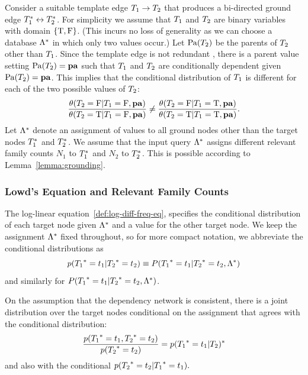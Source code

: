 \documentclass[runningheads,a4paper]{llncs}
\begin{document}
Consider a suitable template edge $T_{1} \rightarrow T_{2}$ that produces a bi-directed ground edge $T_{1}^{*}\hspace{0.0ex} \leftrightarrow T_{2}^{*}\hspace{0.0ex}$. For simplicity we assume that $T_{1}$ and $T_{2}$ are binary variables with domain $\{\mathrm{T},\mathrm{F}\}$. (This incurs no loss of generality as we can choose a database $\Lambda^{*}\hspace{0.0ex}$ in which only two values occur.) Let $\mathrm{Pa}(T_{2})$ be the parents of $T_{2}$ other than $T_{1}$. Since the template edge is not redundant \cite{Pearl1988}, there is a parent value setting $\mathrm{Pa}(T_{2}) = \mathbf{pa}$ such that $T_{1}$ and $T_{2}$ are conditionally dependent given $\mathrm{Pa}(T_{2}) = \mathbf{pa}$. This implies that the conditional distribution of $T_{1}$ is different for each of the two possible values of $T_{2}$:
\begin{equation} \label{eq:dependence}
\frac{\theta(T_{2} = \mathrm{F}|T_{1} = \mathrm{F},\mathbf{pa})}{\theta(T_{2} = \mathrm{T}|T_{1} = \mathrm{F},\mathbf{pa})} \neq \frac{\theta(T_{2} = \mathrm{F}|T_{1} = \mathrm{T},\mathbf{pa})}{\theta(T_{2} = \mathrm{T}|T_{1} = \mathrm{T},\mathbf{pa})}.
\end{equation}
Let $\Lambda^{*}\hspace{0.0ex}$ denote an assignment of values to all ground nodes other than the target nodes $T_{1}^{*}\hspace{0.0ex}$ and $ T_{2}^{*}\hspace{0.0ex}$. We assume that the input query $\Lambda^{*}\hspace{0.0ex}$ assigns different relevant family counts $N_{1}$ to $T_{1}^{*}\hspace{0.0ex}$ and $N_{2}$ to $T_{2}^{*}\hspace{0.0ex}$. This is possible according to Lemma~\ref{lemma:grounding}. 
\subsubsection{Lowd's Equation and Relevant Family Counts}
The log-linear equation~\ref{def:log-diff-freq-eq}, specifies the conditional distribution of each target node given $\Lambda^{*}\hspace{0.0ex}$ and a value for the other target node. We keep the assignment $\Lambda^{*}\hspace{0.0ex}$ fixed throughout, so for more compact notation, we abbreviate the conditional distributions as
$$p({T_{1}}^{*}\hspace{0.0ex} = t_{1}| {T_{2}}^{*}\hspace{0.0ex} = t_{2}) \equiv P({T_{1}}^{*}\hspace{0.0ex} = t_{1}|{T_{2}}^{*}\hspace{0.0ex} = t_{2},\Lambda^{*}\hspace{0.0ex})$$ 
and similarly for $P({T_{1}}^{*}\hspace{0.0ex} = t_{1}|{T_{2}}^{*}\hspace{0.0ex} = t_{2},\Lambda^{*}\hspace{0.0ex})$.

On the assumption that the dependency network is consistent, there is a joint distribution over the target nodes conditional on the assignment that agrees with the conditional distribution:
$$\frac{p({T_{1}}^{*}\hspace{0.0ex} = t_{1}, {T_{2}}^{*}\hspace{0.0ex} = t_{2})}{p({T_{2}}^{*}\hspace{0.0ex} = t_{2})}= p({T_{1}}^{*}\hspace{0.0ex} = t_{1}| {T_{2}})^{*}\hspace{0.0ex}$$
and also with the conditional $p({T_{2}}^{*}\hspace{0.0ex} = t_{2}| {T_{1}}^{*}\hspace{0.0ex}=t_{1}).$
\end{document}
